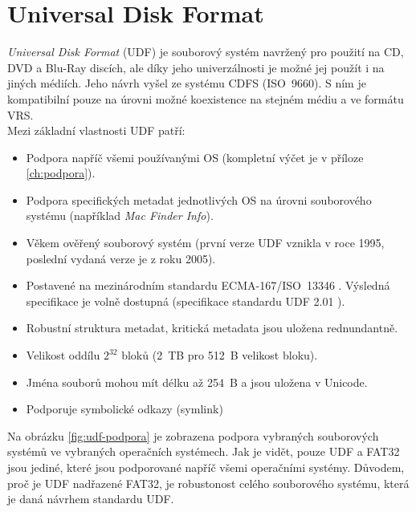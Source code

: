 \chapter{Universal Disk Format}
\label{ch:udf}
\textit{Universal Disk Format} (UDF) je souborový systém navržený pro použití na CD, DVD a Blu-Ray discích, ale díky jeho univerzálnosti je možné jej použít i na jiných médiích. Jeho návrh vyšel ze systému CDFS (ISO~9660). S ním je kompatibilní pouze na úrovni možné koexistence na stejném médiu a ve formátu VRS.\\
Mezi základní vlastnosti UDF patří:
\begin{itemize}
    \item Podpora napříč všemi používanými OS (kompletní výčet je v příloze \ref{ch:podpora}).
    \item Podpora specifických metadat jednotlivých OS na úrovni souborového systému (například \textit{Mac Finder Info}).
    \item Věkem ověřený souborový systém (první verze UDF vznikla v roce 1995, poslední vydaná verze je z roku 2005).
    \item Postavené na mezinárodním standardu ECMA-167/ISO~13346 \cite{ecma-167}. Výsledná specifikace je volně dostupná (specifikace standardu UDF 2.01 \cite{osta-udf-0201}).
    \item Robustní struktura metadat, kritická metadata jsou uložena rednundantně.
    \item Velikost oddílu $2^{32}$ bloků (2~TB pro 512~B velikost bloku).
    \item Jména souborů mohou mít délku až 254~B a jsou uložena v Unicode.
    \item Podporuje symbolické odkazy (symlink)
\end{itemize}
Na obrázku \ref{fig:udf-podpora} je zobrazena podpora vybraných souborových systémů ve vybraných operačních systémech. Jak je vidět, pouze UDF a FAT32 jsou jediné, které jsou podporované napříč všemi operačními systémy. Důvodem, proč je UDF nadřazené FAT32, je robustonost celého souborového systému, která je daná návrhem standardu UDF.
